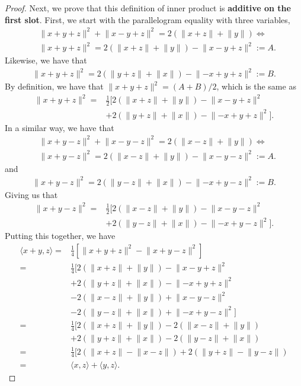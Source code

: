 \begin{proof}
 Next, we prove that this definition of inner product is \textbf{additive on the first slot}. First, we start with the parallelogram equality with three variables, 
 \begin{align*}
     &\lVert x+y+z\rVert^2 + \lVert x-y+z\rVert^2 = 2(\lVert x+z\rVert +\lVert y\rVert) \iff\\
     &\lVert x+y+z\rVert^2 = 2(\lVert x+z\rVert +\lVert y\rVert)-\lVert x-y+z\rVert^2 :=A.
 \end{align*}
  Likewise, we have that 
  \begin{align*}
      \lVert x+y+z\rVert^2 =2(\lVert y+z\rVert +\lVert x\rVert)-\lVert -x+y+z\rVert^2 :=B.
  \end{align*}
   By definition, we have that $\lVert x+y+z\rVert^2 =(A+B)/2$, which is the same as 
   \begin{align*}
       \lVert x+y+z\rVert^2 =&  \frac{1}{2}[2(\lVert x+z\rVert +\lVert y\rVert)-\lVert x-y+z\rVert^2\\
       &+ 2(\lVert y+z\rVert +\lVert x\rVert)-\lVert -x+y+z\rVert^2].
   \end{align*}
   In a similar way, we have that 
   \begin{align*}
       &\lVert x+y-z\rVert^2 + \lVert x-y-z\rVert^2 =2(\lVert x-z\rVert +\lVert y\rVert)\iff\\
       &\lVert x+y-z\rVert^2 =2(\lVert x-z\rVert +\lVert y\rVert)-\lVert x-y-z\rVert^2 :=A.
   \end{align*}
    and 
    \begin{align*}
        \lVert x+y-z\rVert^2 =2(\lVert y-z\rVert +\lVert x\rVert)-\lVert -x+y-z\rVert^2 :=B.
    \end{align*} 
    Giving us that 
    \begin{align*}
        \lVert x+y-z\rVert^2 =& \frac{1}{2}[2(\lVert x-z\rVert +\lVert y\rVert)-\lVert x-y-z\rVert^2\\ 
        &+ 2(\lVert y-z\rVert +\lVert x\rVert)-\lVert -x+y-z\rVert^2].
    \end{align*}
    Putting this together, we have
    \begin{align*}
        \langle x+y,z\rangle =& \frac{1}{4}[\lVert x+y+z\rVert^2-\lVert x+y-z\rVert^2]\\
        =& \frac{1}{4}[2(\lVert x+z\rVert +\lVert y\rVert)-\lVert x-y+z\rVert^2\\
       &+ 2(\lVert y+z\rVert +\lVert x\rVert)-\lVert -x+y+z\rVert^2\\
       &- 2(\lVert x-z\rVert +\lVert y\rVert)+\lVert x-y-z\rVert^2\\ 
        &- 2(\lVert y-z\rVert +\lVert x\rVert)+\lVert -x+y-z\rVert^2]\\
        =& \frac{1}{4}[2(\lVert x+z\rVert +\lVert y\rVert)
        -2(\lVert x-z\rVert +\lVert y\rVert)\\
       &+ 2(\lVert y+z\rVert +\lVert x\rVert)
       -2(\lVert y-z\rVert +\lVert x\rVert)\\
       =& \frac{1}{4}[2(\lVert x+z\rVert -\lVert x-z\rVert)
       + 2(\lVert y+z\rVert -\lVert y-z\rVert)\\
       =& \langle x,z\rangle +\langle y, z\rangle.
    \end{align*}


\end{proof}
